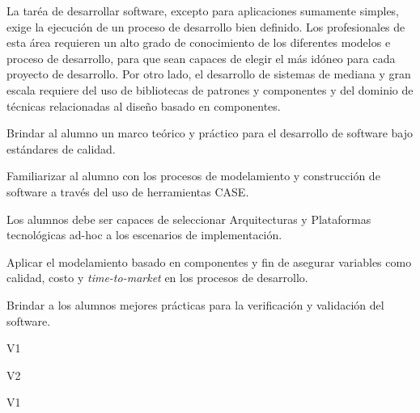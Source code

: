 \begin{syllabus}


\begin{justification}
La taréa de desarrollar software, excepto para aplicaciones sumamente simples, exige la ejecución de un proceso de desarrollo bien definido. 
Los profesionales de esta área requieren un alto grado de conocimiento de los diferentes modelos e proceso de desarrollo, 
para que sean capaces de elegir el más idóneo para cada proyecto de desarrollo. Por otro lado, el desarrollo de sistemas 
de mediana y gran escala requiere del uso de bibliotecas de patrones y componentes y del dominio de técnicas relacionadas al 
diseño basado en componentes.
\end{justification}

\begin{goals}
\item Brindar al alumno un marco teórico y práctico para el desarrollo de software bajo estándares de calidad.
\item Familiarizar al alumno con los procesos de modelamiento y construcción de software a través del uso de herramientas CASE.
\item Los alumnos debe ser capaces de seleccionar Arquitecturas y Plataformas tecnológicas ad-hoc a los escenarios de implementación.
\item Aplicar el modelamiento basado en componentes y fin de asegurar variables como calidad, costo  y \textit{time-to-market} en los procesos de desarrollo.
\item Brindar a los alumnos mejores prácticas para la verificación y validación del software.
\end{goals}

\begin{outcomes}{V1}
    \item {}
    \item {}
\end{outcomes}

\begin{outcomes}{V2}
    \item {}
\end{outcomes}

\begin{competences}{V1}
      \item {} 
      \item {}
      \item {}
      \item {}
      \item {}
      \item {}
\end{competences}


\end{syllabus}
